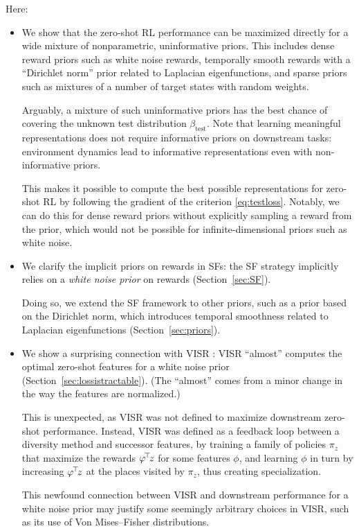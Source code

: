 \documentclass[11pt,a4paper]{article}
\newcommand{\betatest}{\beta_{\mathrm{test}}}
\begin{document}
Here:
\begin{itemize}
\item
We show that the zero-shot RL performance can be maximized directly
for a wide mixture of nonparametric, uninformative priors. This includes
dense reward priors such as white noise rewards, temporally smooth
rewards with a ``Dirichlet norm'' prior related to Laplacian
eigenfunctions, and sparse priors such as mixtures of a number of target
states with random weights.

Arguably, a mixture of such uninformative priors has the best chance of
covering the unknown test distribution $\betatest$. Note that learning
meaningful representations does not require informative priors on
downstream tasks:  environment dynamics lead to informative
representations even with non-informative priors.

This makes it possible to compute the best possible representations
for zero-shot RL by following the gradient of the criterion
\eqref{eq:testloss}. Notably, we can do this for dense reward priors
without
explicitly sampling a reward from the prior, which
would not be possible for infinite-dimensional priors such as white
noise.

\item We clarify the implicit priors on rewards in SFs: the SF strategy
implicitly relies on a \emph{white noise prior} on rewards
(Section~\ref{sec:SF}).

Doing so, we extend the SF framework to other priors, such as a prior
based on the Dirichlet norm, which introduces temporal smoothness related
to Laplacian eigenfunctions (Section~\ref{sec:priors}).

\item We show a surprising connection with VISR \cite{visr}: VISR
``almost'' computes the optimal zero-shot features for a white noise
prior (Section~\ref{sec:lossistractable}). 
(The ``almost'' comes from a minor change in the way the features are
normalized.)

This is unexpected, as VISR was not defined to maximize downstream
zero-shot performance. Instead, VISR was defined as a feedback loop
between a diversity method \cite{eysenbach2018diversity} and successor
features, by 
training a family of
policies $\pi_z$ that maximize the rewards $\varphi^{\!\top}\!z$ for some
features $\phi$, and learning $\phi$ in turn by increasing $\varphi^{\!\top}\!z$
at the places visited by $\pi_z$, thus creating specialization.

This newfound connection between VISR and downstream performance for a
white noise prior may justify some seemingly arbitrary choices in VISR,
such as its use of Von Mises--Fisher distributions.


\end{itemize}
\end{document}

